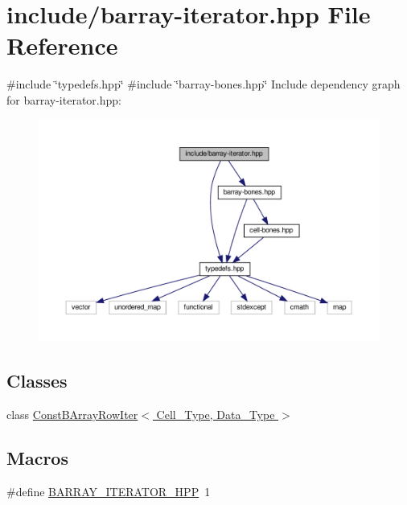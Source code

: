 \hypertarget{barray-iterator_8hpp}{}\section{include/barray-\/iterator.hpp File Reference}
\label{barray-iterator_8hpp}
{\ttfamily \#include \char`\"{}typedefs.\+hpp\char`\"{}}\newline
{\ttfamily \#include \char`\"{}barray-\/bones.\+hpp\char`\"{}}\newline
Include dependency graph for barray-\/iterator.hpp\+:\nopagebreak
\begin{figure}[H]
\begin{center}
\leavevmode
\includegraphics[width=350pt]{barray-iterator_8hpp__incl}
\end{center}
\end{figure}
\subsection*{Classes}
\begin{DoxyCompactItemize}
\item 
class \hyperlink{class_const_b_array_row_iter}{Const\+B\+Array\+Row\+Iter$<$ Cell\+\_\+\+Type, Data\+\_\+\+Type $>$}
\end{DoxyCompactItemize}
\subsection*{Macros}
\begin{DoxyCompactItemize}
\item 
\#define \hyperlink{barray-iterator_8hpp_af7d28058e98dd1797def3cd230abe121}{B\+A\+R\+R\+A\+Y\+\_\+\+I\+T\+E\+R\+A\+T\+O\+R\+\_\+\+H\+PP}~1
\end{DoxyCompactItemize}


